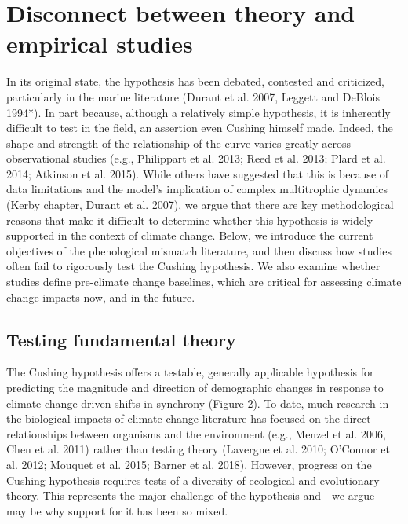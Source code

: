 \documentclass[11pt, oneside]{article}   	%
\begin{document}
\section{Disconnect between theory and empirical studies}
In its original state, the hypothesis has been debated, contested and criticized, particularly in the marine literature (Durant et al. 2007, Leggett and DeBlois 1994*). In part because, although a relatively simple hypothesis, it is inherently difficult to test in the field, an assertion even Cushing himself made. Indeed, the shape and strength of the relationship of the curve varies greatly across observational studies (e.g., Philippart et al. 2013; Reed et al. 2013; Plard et al. 2014; Atkinson et al. 2015). While others have suggested that this is because of data limitations and the model’s implication of complex multitrophic dynamics (Kerby chapter, Durant et al. 2007), we argue that there are key methodological reasons that make it difficult to determine whether this hypothesis is widely supported in the context of climate change. Below, we introduce the current objectives of the phenological mismatch literature, and then discuss how studies often fail to rigorously test the Cushing hypothesis. We also examine whether studies define pre-climate change baselines, which are critical for assessing climate change impacts now, and in the future.

\subsection{Testing fundamental theory}

The Cushing hypothesis offers a testable, generally applicable hypothesis for predicting the magnitude and direction of demographic changes in response to climate-change driven shifts in synchrony (Figure 2). To date, much research in the biological impacts of climate change literature has focused on the direct relationships between organisms and the environment (e.g., Menzel et al. 2006, Chen et al. 2011) rather than testing theory (Lavergne et al. 2010; O’Connor et al. 2012; Mouquet et al. 2015; Barner et al. 2018). However, progress on the Cushing hypothesis requires tests of a diversity of ecological and evolutionary theory. This represents the major challenge of the hypothesis and—we argue—may be why support for it has been so mixed. 



\end{document}
